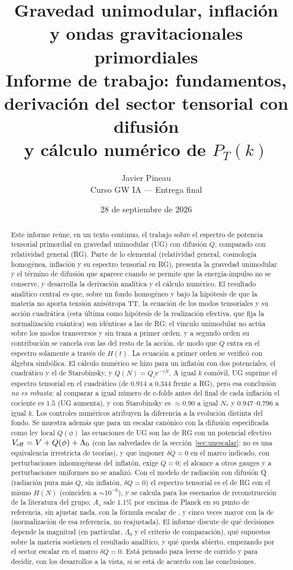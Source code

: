 \documentclass[11pt,a4paper]{article}
\title{\textbf{Gravedad unimodular, inflación\\ y ondas gravitacionales primordiales}\\[0.6em]
\large Informe de trabajo: fundamentos, derivación del sector tensorial con difusión\\ y cálculo numérico de $P_T(k)$}
\author{Javier Pineau\\ \small Curso GW IA --- Entrega final}
\date{28 de septiembre de 2026}
\numberwithin{equation}{section}
\newcommand{\ee}{\mathrm e}
\renewcommand{\_}{\oldunderscore\hspace{0pt}}
\begin{document}
\maketitle
\thispagestyle{fancy}

\begin{abstract}
\noindent
Este informe reúne, en un texto continuo, el trabajo sobre el espectro de potencia tensorial primordial en gravedad unimodular (UG) con difusión $Q$, comparado con relatividad general (RG). Parte de lo elemental (relatividad general, cosmología homogénea, inflación y su espectro tensorial en RG), presenta la gravedad unimodular y el término de difusión que aparece cuando se permite que la energía-impulso no se conserve, y desarrolla la derivación analítica y el cálculo numérico. El resultado analítico central es que, sobre un fondo homogéneo y bajo la hipótesis de que la materia no aporta tensión anisótropa TT, la ecuación de los modos tensoriales y su acción cuadrática (esta última como hipótesis de la realización efectiva, que fija la normalización cuántica) son idénticas a las de RG: el vínculo unimodular no actúa sobre los modos transversos y sin traza a primer orden, y a segundo orden su contribución se cancela con las del resto de la acción, de modo que $Q$ entra en el espectro solamente a través de $H(t)$. La ecuación a primer orden se verificó con álgebra simbólica. El cálculo numérico se hizo para un inflatón con dos potenciales, el cuadrático y el de Starobinsky, y $Q(N)=Q_i\ee^{-\gamma N}$. A igual $k$ comóvil, UG suprime el espectro tensorial en el cuadrático (de $0.914$ a $0.344$ frente a RG), pero esa conclusión \emph{no es robusta}: al comparar a igual número de e-folds antes del final de cada inflación el cociente es $1.5$ (UG aumenta), y con Starobinsky es $\approx0.90$ a igual $N_*$ y $0.947$--$0.796$ a igual $k$. Los controles numéricos atribuyen la diferencia a la evolución distinta del fondo. Se muestra además que para un escalar canónico con la difusión especificada como ley local $Q(\phi)$ las ecuaciones de UG son las de RG con un potencial efectivo $V_{\rm eff}=V+Q(\phi)+\Lambda_0$ (con las salvedades de la sección~\ref{sec:unescalar}: no es una equivalencia irrestricta de teorías), y que imponer $\delta Q=0$ en el marco indicado, con perturbaciones inhomogéneas del inflatón, exige $\dot Q=0$; el alcance a otros gauges y a perturbaciones uniformes no se analizó. Con el modelo de radiación con difusión Q \cite{leon22,piccirilli23} (radiación pura más $Q$, sin inflatón, $\delta Q=0$) el espectro tensorial es el de RG con el mismo $H(N)$ (coinciden a $\sim10^{-6}$), y se calcula para los escenarios de reconstrucción de la literatura del grupo; $A_s$ sale $1.1\%$ por encima de Planck en su punto de referencia, sin ajustar nada, con la fórmula escalar de \cite{piccirilli23}, y cinco veces mayor con la de \cite{leon22} (normalización de esa referencia, no reajustada). El informe discute de qué decisiones depende la magnitud (en particular, $\Lambda_0$ y el criterio de comparación), qué supuestos sobre la materia sostienen el resultado analítico, y qué queda abierto, empezando por el sector escalar en el marco $\delta Q=0$. Está pensado para leerse de corrido y para decidir, con los desarrollos a la vista, si se está de acuerdo con las conclusiones.

\end{abstract}
\end{document}
